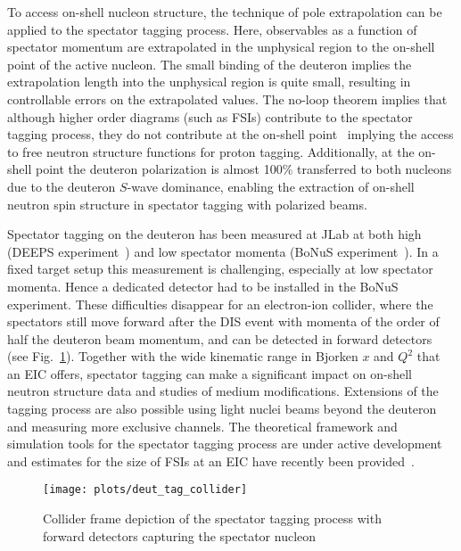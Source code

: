 To access on-shell nucleon structure, the technique of pole extrapolation can be applied to the spectator tagging process.  Here, observables as a function of spectator momentum are extrapolated in the unphysical region to the on-shell point of the active nucleon.  The small binding of the deuteron implies the extrapolation length into the unphysical region is quite small, resulting in controllable errors on the extrapolated values.  The no-loop theorem implies that although higher order diagrams (such as FSIs) contribute to the spectator tagging process, they do not contribute at the on-shell point~\cite{Sargsian:2005rm} implying the access to free neutron structure functions for proton tagging.  Additionally, at the on-shell point the deuteron polarization is almost 100\% transferred to both nucleons due to the deuteron $S$-wave dominance, enabling the extraction of on-shell neutron spin structure in spectator tagging with polarized beams.  

Spectator tagging on the deuteron has been measured at JLab at both high (DEEPS experiment~\cite{Klimenko:2005zz}) and low spectator momenta (BoNuS experiment~\cite{Baillie:2011za}). In a fixed target setup this measurement is challenging, especially at low spectator momenta. Hence a dedicated detector had to be installed in the BoNuS experiment.  These difficulties disappear for an electron-ion collider, where the spectators still move forward after the DIS event with momenta of the order of half the deuteron beam momentum, and can be detected in forward detectors (see Fig.~\ref{fig:collider}).  Together with the wide kinematic range in Bjorken $x$ and $Q^2$ that an EIC offers, spectator tagging can make a significant impact on on-shell neutron structure data and studies of medium modifications.  Extensions of the tagging process are also possible using light nuclei beams beyond the deuteron and measuring more exclusive channels.  The theoretical framework and simulation tools for the spectator tagging process are under active development~\cite{deutLDRD,Guzey:2014jva,Cosyn:2016oiq} and estimates for the size of FSIs at an EIC have recently been provided~\cite{Strikman:2017koc}.

    \begin{figure}[tbp]
        \texttt{[image: plots/deut\_tag\_collider]}
        \caption{Collider frame depiction of the spectator tagging process with forward detectors capturing the spectator nucleon~\cite{deutLDRD}}
        \label{fig:collider}
    \end{figure}

